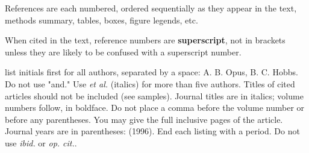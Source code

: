 \newcommand{\bib}{\bibitem}
\def\arpc{Ann. Rev. Phys. Chem.~~}
\def\irpc{Int. Rev. Phys. Chem.~~}
\def\jcp{J. Chem. Phys.~~}
\def\jacs{J. Am. Chem. Soc.~~}
\def\acp{Adv. Chem. Phys.~~}
\def\cp{Chem. Phys.~~}
\def\cpc{Comput. Phys. Commun.~~}
\def\cpr{Comput. Phys. Rep.~~}
\def\csr{Chem. Soc. Rev.~~}
\def\cpl{Chem. Phys. Lett.~~}
\def\cjc{Can. J. Chem.~~}
\def\cs{Curr. Sci.~~}
\def\acr{Acc. Chem. Res.~~}
\def\mph{Mol. Phys.~~}
\def\prl{Phys. Rev. Lett.~~}
\def\jpc{J. Phys. Chem.~~}
\def\joc{J. Org. Chem.~~}
\def\jms{J. Mol.  Structure~~}
\def\josab{J. Opt. Soc. Am. B~~}
\def\jao{J. Appl. Opt.~~}
\def\ijqc{Int. J. Quant. Chem.~~}
\def\sc{Science~~}
\def\tca{Theoret. Chim. Acta~~}
\def\pr{Phys. Rep.~~}
\def\ssr{Surf. Sci. Reports~~}
\def\prb{Phys. Rev. B~~}
\def\pra{Phys. Rev. A~~}
\def\prs{Proc. Roy. Soc.~~}
\def\pias{Proc. Indian Acad. Sci.~~}
\def\rpp{Rep. Prog. Phys.~~}
\def\pla{Phys. Letters A~~}
\def\fdcs{Faraday Discuss. Chem. Soc.~~}
\def\jcsft{J. Chem. Soc. Faraday Trans.~~}
\def\jrs{J. Raman Spectry.~~}
\def\rmp{Rev. Mod. Phys.~~}

\clearpage
{}
\begin{thebibliography}{99}

\end{thebibliography}

\baselineskip 15pt
\setlength{\parskip}{10pt}

\noindent References are each numbered, ordered sequentially as they appear in the text, methods summary, tables, boxes, figure legends, etc. 

\noindent When cited in the text, reference numbers are {\bf superscript}, not in brackets unless they are likely to be confused with a superscript number.


 list initials first for all authors, separated by a space: A. B. Opus, B. C. Hobbs. Do not use "and." Use {\em et al.} (italics) for more than five authors. Titles of cited articles should not be included (see samples). Journal titles are in italics; volume numbers follow, in boldface. Do not place a comma before the volume number or before any parentheses. You may give the full inclusive pages of the article. Journal years are in parentheses: (1996). End each listing with a period. Do not use {\em ibid.} or {\em op. cit.}.

